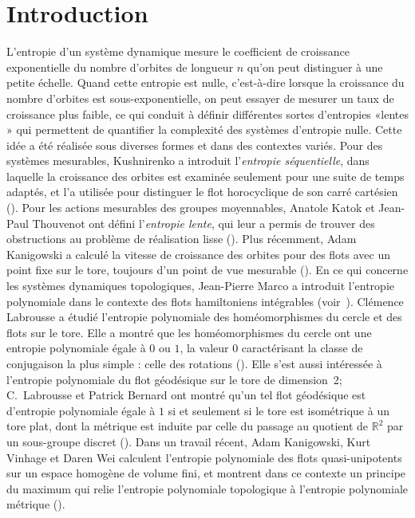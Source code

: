 \documentclass[11pt]{article}
\providecommand{\og}{«\nobreakspace}
\providecommand{\fg}{\nobreakspace»}
\theoremstyle{definition}
\numberwithin{equation}{section}
\numberwithin{figure}{section}
\numberwithin{table}{section}
\begin{document}
\section{Introduction}

L'entropie d'un système dynamique mesure le coefficient de croissance exponentielle du nombre d'orbites de longueur $n$ qu'on peut distinguer à une petite échelle. Quand cette entropie est nulle, c'est-à-dire lorsque la croissance du nombre d'orbites est sous-exponentielle, on peut essayer de mesurer un taux de croissance plus faible, ce qui conduit à définir différentes sortes d'entropies \og lentes \fg{} qui permettent de quantifier la complexité des systèmes d'entropie nulle. Cette idée a été réalisée sous diverses formes et dans des contextes variés. Pour des systèmes mesurables, Kushnirenko a introduit l'\emph{entropie séquentielle}, dans laquelle la croissance des orbites est examinée seulement pour une suite de temps adaptés, et l'a utilisée pour distinguer le flot horocyclique de son carré cartésien (\cite{Kus67}). Pour les actions mesurables des groupes moyennables, Anatole Katok et Jean-Paul Thouvenot ont défini l'\emph{entropie lente}, qui leur a permis de trouver des obstructions au problème de réalisation lisse (\cite{KatTho97}). Plus récemment, Adam Kanigowski a calculé la vitesse de croissance des orbites pour des flots avec un point fixe sur le tore, toujours d'un point de vue mesurable (\cite{Kan18}). En ce qui concerne les systèmes dynamiques topologiques, Jean-Pierre Marco a introduit l'entropie polynomiale dans le contexte des flots hamiltoniens intégrables (voir~\cite{Mar13}). Clémence Labrousse a étudié l'entropie polynomiale des homéomorphismes du cercle et des flots sur le tore. Elle a montré que les homéomorphismes du cercle ont une entropie polynomiale égale à $0$ ou $1$, la valeur $0$ caractérisant la classe de conjugaison la plus simple : celle des rotations (\cite{Lab13}). Elle s'est aussi intéressée à l'entropie polynomiale du flot géodésique sur le tore de dimension~2; C.~Labrousse et Patrick Bernard ont montré qu'un tel flot géodésique est d'entropie polynomiale égale à $1$ si et seulement si le tore est isométrique à un tore plat, dont la métrique est induite par celle du passage au quotient de $\mathbb R^2$ par un sous-groupe discret (\cite{BerLab16}). Dans un travail récent, Adam Kanigowski, Kurt Vinhage et Daren Wei calculent l'entropie polynomiale des flots quasi-unipotents sur un espace homogène de volume fini, et montrent dans ce contexte un principe du maximum qui relie l'entropie polynomiale topologique à l'entropie polynomiale métrique (\cite{KVW18}).
\end{document}
